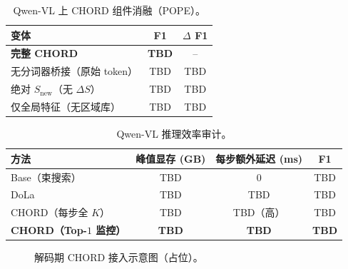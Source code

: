 \begin{table}[t]
  \centering
  \caption{Qwen-VL 上 CHORD 组件消融（POPE）。}
  \label{tab:ablation}
  \small
  \begin{tabular}{lcc}
    \toprule
    变体 & F1 & $\Delta$ F1 \\
    \midrule
    \textbf{完整 CHORD} & \textbf{TBD} & -- \\
    无分词器桥接（原始 token） & TBD & TBD \\
    绝对 $S_{\text{new}}$（无 $\Delta S$） & TBD & TBD \\
    仅全局特征（无区域库） & TBD & TBD \\
    \bottomrule
  \end{tabular}
\end{table}

\begin{table}[t]
  \centering
  \caption{Qwen-VL 推理效率审计。}
  \label{tab:efficiency}
  \small
  \begin{tabular}{lccc}
    \toprule
    方法 & 峰值显存 (GB) & 每步额外延迟 (ms) & F1 \\
    \midrule
    Base（束搜索） & TBD & 0 & TBD \\
    DoLa & TBD & TBD & TBD \\
    CHORD（每步全 $K$） & TBD & TBD（高） & TBD \\
    \textbf{CHORD（Top-$1$ 监控）} & \textbf{TBD} & \textbf{TBD} & \textbf{TBD} \\
    \bottomrule
  \end{tabular}
\end{table}

\begin{figure}[t]
  \centering
  \caption{解码期 CHORD 接入示意图（占位）。}
  \label{fig:overview}
\end{figure}
